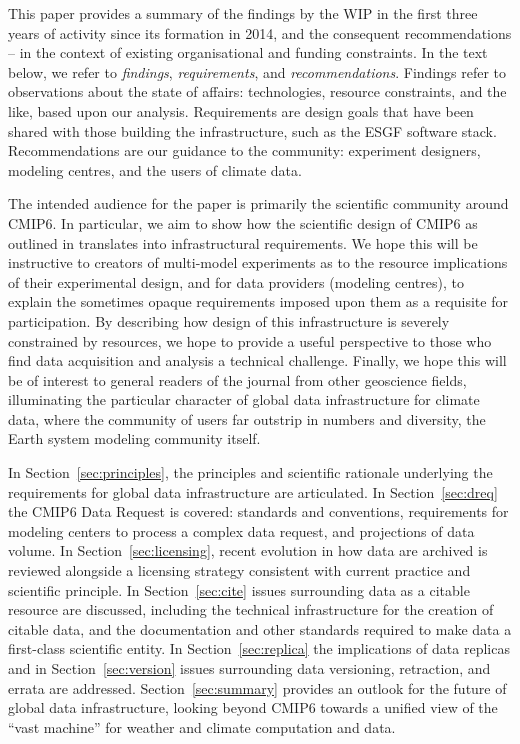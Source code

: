 \documentclass[gmd,manuscript]{copernicus}
\begin{document}
This paper provides a summary of the findings by the WIP in the first
three years of activity since its formation in 2014, and the
consequent recommendations -- in the context of existing
organisational and funding constraints.
In the text below, we refer to \emph{findings}, \emph{requirements},
and \emph{recommendations}. Findings refer to observations about the
state of affairs: technologies, resource constraints, and the like,
based upon our analysis. Requirements are design goals that have been
shared with those building the infrastructure, such as the ESGF
software stack. Recommendations are our guidance to the community:
experiment designers, modeling centres, and the users of climate data.

The intended audience for the paper is primarily the scientific
community around CMIP6. In particular, we aim to show how the
scientific design of CMIP6 as outlined in \cite{ref:eyringetal2016a}
translates into infrastructural requirements. We hope this will be
instructive to creators of multi-model experiments as to the resource
implications of their experimental design, and for data providers
(modeling centres), to explain the sometimes opaque requirements imposed
upon them as a requisite for participation. By describing how 
design of this infrastructure is severely constrained by resources, we hope to
provide a useful perspective to  those who find data acquisition and analysis a technical
challenge.   Finally, we hope this will be of
interest to general readers of the journal from other geoscience
fields, illuminating the particular character of global data
infrastructure for climate data, where the community of users far
outstrip in numbers and diversity, the Earth system modeling community
itself.

In Section~\ref{sec:principles}, the principles and scientific
rationale underlying the requirements for global data infrastructure
are articulated. In Section~\ref{sec:dreq} the CMIP6 Data Request is
covered: standards and conventions, requirements for modeling centers
to process a complex data request, and projections of data volume. In
Section~\ref{sec:licensing}, recent evolution in how data are archived
is reviewed alongside a licensing strategy consistent with current
practice and scientific principle. In Section~\ref{sec:cite} issues
surrounding data as a citable resource are discussed, including the
technical infrastructure for the creation of citable data, and the
documentation and other standards required to make data a first-class
scientific entity. In Section~\ref{sec:replica} the implications of
data replicas and in Section~\ref{sec:version} issues surrounding data
versioning, retraction, and errata are addressed.
Section~\ref{sec:summary} provides an outlook for the future of global
data infrastructure, looking beyond CMIP6 towards a unified view of
the ``vast machine'' for weather and climate computation and data.
\end{document}
